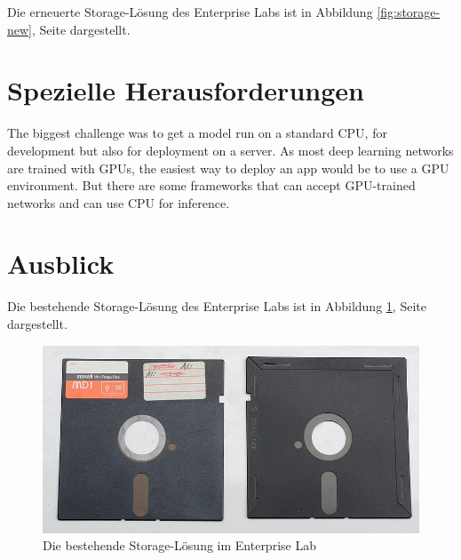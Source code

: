 \documentclass[a4paper,10pt,hidelinks]{scrartcl}
\newcommand{\imgref}[1]{{Abbildung \ref{#1}, Seite \pageref{#1}}}
\begin{document}
Die erneuerte Storage-Lösung des Enterprise Labs ist in \imgref{fig:storage-new} dargestellt.

\section{\fontsize{14}{16}\selectfont Spezielle Herausforderungen}

The biggest challenge was to get a model run on a standard CPU, for development but also for deployment on a server. As most deep learning networks are trained with GPUs, the easiest way to deploy an app would be to use a GPU environment. But there are some frameworks that can accept GPU-trained networks and can use CPU for inference.

\section{\fontsize{14}{16}\selectfont Ausblick}

Die bestehende Storage-Lösung des Enterprise Labs ist in \imgref{fig:storage-old} dargestellt.

\begin{figure}
    \centering
    \includegraphics[width=0.5\linewidth]{pics/storage-old.jpg}
    \caption{Die bestehende Storage-Lösung im Enterprise Lab}
    \label{fig:storage-old}
\end{figure}
\end{document}
